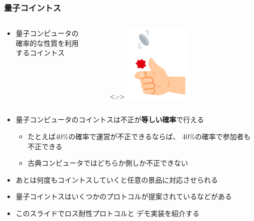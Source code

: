 \begin{frame}
  \frametitle{量子コイントス}

  \pause
  \begin{columns}
    \begin{column}{0.7\textwidth}
      \begin{itemize}
        \item<+-> 量子コンピュータの確率的な性質を利用するコイントス
      \end{itemize}
    \end{column}
    \begin{column}{0.3\textwidth}
      \begin{figure}[h]
        \uncover<.->{
          \includegraphics[width=0.5\textwidth]{img/sports_coin_toss.png}
        }
      \end{figure}
    \end{column}
  \end{columns}
  
  \begin{itemize}
    \item<+-> 量子コンピュータのコイントスは不正が\textbf{等しい確率}で行える
    \begin{itemize}
      \item たとえば40\%の確率で運営が不正できるならば、
      40\%の確率で参加者も不正できる
      \item 古典コンピュータではどちらか側しか不正できない
    \end{itemize}

    \item<+-> あとは何度もコイントスしていくと任意の景品に対応させられる
  \end{itemize}

  \begin{itemize}
    \item<+-> 量子コイントスはいくつかのプロトコルが提案されている\cite{Bennett2014QuantumCP, PhysRevA.80.062321}などがある
    \item<+-> このスライドでロス耐性プロトコル\cite{PhysRevA.80.062321}と
    デモ実装を紹介する
  \end{itemize}
\end{frame}

